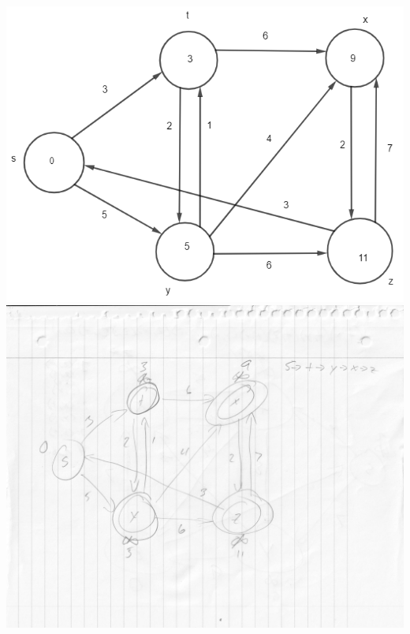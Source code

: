 \documentclass[12pt]{article}
\begin{document}
\begin{enumerate}
\includegraphics[scale=.65]{24.3-1 Vertex S/1-3.png}\\
\includegraphics[scale=.32]{24.3-1 Vertex S/24.3-1S.jpg}\\


\end{enumerate}
\end{document}
